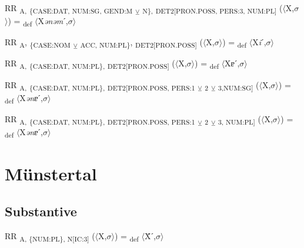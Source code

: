 {\begin{exe}
 RR \textsubscript{A,} \textsubscript{\{CASE:DAT, NUM:SG, GEND:M} \textsubscript{${\veebar}$}\textsubscript{ N\},} \textsubscript{DET2[PRON.POSS, PERS:3, NUM:PL]} ($\langle$X,$\sigma $$\rangle$) = \textsubscript{def} $\langle$X\textit{ənəm}ˊ,$\sigma $$\rangle$
\end{exe}

\begin{exe}
 RR \textsubscript{A}, \textsubscript{\{CASE:NOM} \textsubscript{${\veebar}$}\textsubscript{ ACC, NUM:PL\}}, \textsubscript{DET2[PRON.POSS]} ($\langle$X,$\sigma $$\rangle$) = \textsubscript{def} $\langle$X\textit{i}ˊ,$\sigma $$\rangle$
\end{exe}

\begin{exe}
 RR \textsubscript{A,} \textsubscript{\{CASE:DAT, NUM:PL\},} \textsubscript{DET2[PRON.POSS]} ($\langle$X,$\sigma $$\rangle$) = \textsubscript{def} $\langle$X\textit{ɐ}ˊ,$\sigma $$\rangle$
\end{exe}

\begin{exe}
 RR \textsubscript{A,} \textsubscript{\{CASE:DAT, NUM:PL\},} \textsubscript{DET2[PRON.POSS, PERS:1} \textsubscript{${\veebar}$}\textsubscript{ 2} \textsubscript{${\veebar}$}\textsubscript{ 3,NUM:SG]} ($\langle$X,$\sigma $$\rangle$) = \textsubscript{def} $\langle$X\textit{ənɐ}ˊ,$\sigma $$\rangle$
\end{exe}

\begin{exe}
 RR \textsubscript{A,} \textsubscript{\{CASE:DAT, NUM:PL\},} \textsubscript{DET2[PRON.POSS, PERS:1} \textsubscript{${\veebar}$}\textsubscript{ 2} \textsubscript{${\veebar}$}\textsubscript{ 3, NUM:PL]} ($\langle$X,$\sigma $$\rangle$) = \textsubscript{def} $\langle$X\textit{ənɐ}ˊ,$\sigma $$\rangle$
\end{exe}

\section{Münstertal}

\subsection{Substantive}

\begin{exe}
 RR \textsubscript{A, \{NUM:PL\}, N[IC:3]} ($\langle$X,$\sigma $$\rangle$) = \textsubscript{def} $\langle$Ẍˊ,$\sigma $$\rangle$
\end{exe}

}
